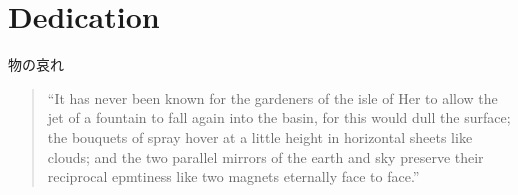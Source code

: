 
\pagestyle{empty}

\chapter{Dedication}






\begin{CJK}{UTF8}{min}
  物の哀れ
\end{CJK}

\begin{quote}
  ``It has never been known for the gardeners of the isle of Her to allow the jet of a fountain to fall again into the basin, for this would dull the surface; the bouquets of spray hover at a little height in horizontal sheets like clouds; and the two parallel mirrors of the earth and sky preserve their reciprocal epmtiness like two magnets eternally face to face.'' \citep[p.49]{Jarry1997}
\end{quote}

\clearpage

